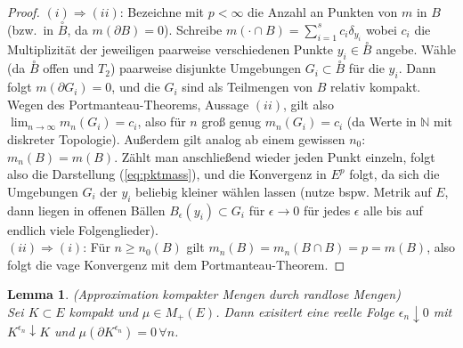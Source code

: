 \documentclass[twoside]{article}
\newtheorem{lemma}[theorem]{Lemma}
\theoremstyle{definition}
\begin{document}
\begin{proof}
$(i) \Longrightarrow (ii)$: Bezeichne mit $p < \infty$ die Anzahl an Punkten von $m$ in $B$ (bzw.\ in $\overset{\circ}{B}$, da $m(\partial B) = 0$). Schreibe $m(\cdot \cap B) = \sum_{i=1}^s c_i \delta_{y_i}$ wobei $c_i$ die Multiplizität der jeweiligen paarweise verschiedenen Punkte $y_i \in \overset{\circ}{B}$ angebe. Wähle (da $\overset{\circ}{B}$ offen und $T_2$) paarweise disjunkte Umgebungen $ G_i \subset \overset{\circ}{B}$ für die $y_i$. Dann folgt $m(\partial G_i) = 0$, und die $G_i$ sind als Teilmengen von $B$ relativ kompakt. Wegen des Portmanteau-Theorems, Aussage $(ii)$, gilt also $\lim_{n \to \infty} m_n(G_i) = c_i$, also für $n$ groß genug $m_n(G_i) = c_i$ (da Werte in $\mathbb{N}$ mit diskreter Topologie). Außerdem gilt analog ab einem gewissen $n_0$: $m_n(B)=m(B)$. Zählt man anschließend wieder jeden Punkt einzeln, folgt also die Darstellung (\ref{eq:pktmass}), und die Konvergenz in $E^p$ folgt, da sich die Umgebungen $G_i$ der $y_i$ beliebig kleiner wählen lassen (nutze bspw. Metrik auf $E$, dann liegen in offenen Bällen $B_{\epsilon}(y_i) \subset G_i$ für $\epsilon \to 0$ für jedes $\epsilon$ alle bis auf endlich viele Folgenglieder).\\

$(ii) \Longrightarrow (i)$: Für $n \geq n_0(B)$ gilt $m_n(B) = m_n(B \cap B) = p = m(B)$, also folgt die vage Konvergenz mit dem Portmanteau-Theorem.
\end{proof}
\begin{lemma} (Approximation kompakter Mengen durch randlose Mengen)\\
Sei $K \subset E$ kompakt und $\mu \in M_+(E)$. Dann exisitert eine reelle Folge $\epsilon_n \downarrow 0$ mit $K^{\epsilon_n} \downarrow K$ und $\mu(\partial K^{\epsilon_n} ) = 0 \, \forall n$.
\end{lemma}
\end{document}
